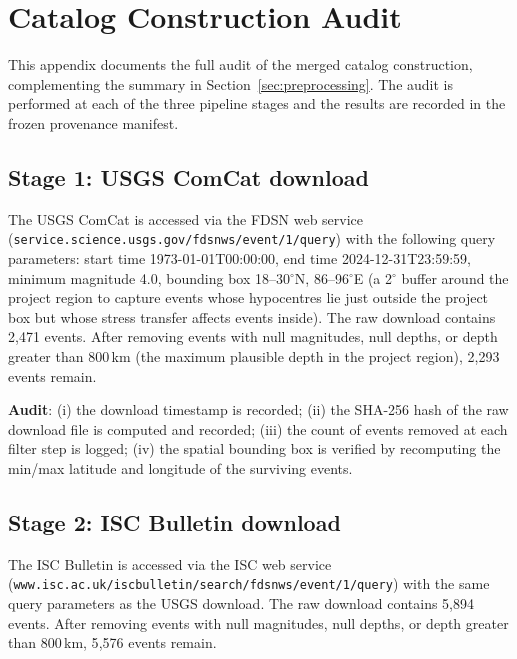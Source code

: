 \documentclass[10pt,a4paper,twocolumn]{article}
\begin{document}
\section{Catalog Construction Audit}\label{app:catalog-audit}

This appendix documents the full audit of the merged catalog construction, complementing the summary in Section~\ref{sec:preprocessing}. The audit is performed at each of the three pipeline stages and the results are recorded in the frozen provenance manifest.

\subsection{Stage 1: USGS ComCat download}

The USGS ComCat is accessed via the FDSN web service (\texttt{service.science.usgs.gov/fdsnws/event/1/query}) with the following query parameters: start time 1973-01-01T00:00:00, end time 2024-12-31T23:59:59, minimum magnitude 4.0, bounding box 18--30$^\circ$N, 86--96$^\circ$E (a 2$^\circ$ buffer around the project region to capture events whose hypocentres lie just outside the project box but whose stress transfer affects events inside). The raw download contains 2{,}471 events. After removing events with null magnitudes, null depths, or depth greater than 800\,km (the maximum plausible depth in the project region), 2{,}293 events remain.

\textbf{Audit}: (i) the download timestamp is recorded; (ii) the SHA-256 hash of the raw download file is computed and recorded; (iii) the count of events removed at each filter step is logged; (iv) the spatial bounding box is verified by recomputing the min/max latitude and longitude of the surviving events.

\subsection{Stage 2: ISC Bulletin download}

The ISC Bulletin is accessed via the ISC web service (\texttt{www.isc.ac.uk/iscbulletin/search/fdsnws/event/1/query}) with the same query parameters as the USGS download. The raw download contains 5{,}894 events. After removing events with null magnitudes, null depths, or depth greater than 800\,km, 5{,}576 events remain.
\end{document}
